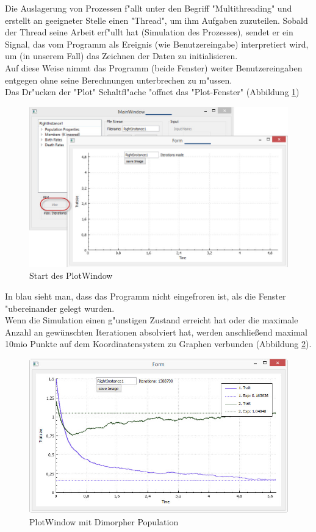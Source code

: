 \documentclass[11pt, a4paper, german]{article}
\theoremstyle{plain}
\begin{document}
	Die Auslagerung von Prozessen f"allt unter den Begriff "{}Multithreading"{} und erstellt an geeigneter Stelle einen "{}Thread"{}, um ihm Aufgaben zuzuteilen. Sobald der Thread seine Arbeit erf"ullt hat (Simulation des Prozesses), sendet er ein Signal, das vom Programm als Ereignis (wie Benutzereingabe) interpretiert wird, um (in unserem Fall) das Zeichnen der Daten zu initialisieren.\\
	Auf diese Weise nimmt das Programm (beide Fenster) weiter Benutzereingaben entgegen ohne seine Berechnungen unterbrechen zu m"ussen.\\
	Das Dr"ucken der "{}Plot"{} Schaltfl"ache "offnet das "{}Plot-Fenster"{} (Abbildung \ref{PlotWindow_start})
	\begin{figure}[H]
		\centering
		\includegraphics[width=1\linewidth]{./Pictures/PlotWindow_start}
		\caption[PlotWindow_start]{Start des PlotWindow}
		\label{PlotWindow_start}
	\end{figure}
	In blau sieht man, dass das Programm nicht eingefroren ist, als die Fenster "ubereinander gelegt wurden.\\
	Wenn die Simulation  einen g"unstigen Zustand erreicht hat oder die maximale Anzahl an gewünschten Iterationen absolviert hat, werden anschließend maximal 10mio Punkte auf dem Koordinatensystem zu Graphen verbunden (Abbildung \ref{PlotWindow_smallBPDL}). 
	\begin{figure}[H]
		\centering
		\includegraphics[width=1\linewidth]{./Pictures/PlotWindow_smallBPDL}
		\caption[PlotWindow]{PlotWindow mit Dimorpher Population}
		\label{PlotWindow_smallBPDL}
	\end{figure}
	
\end{document}

